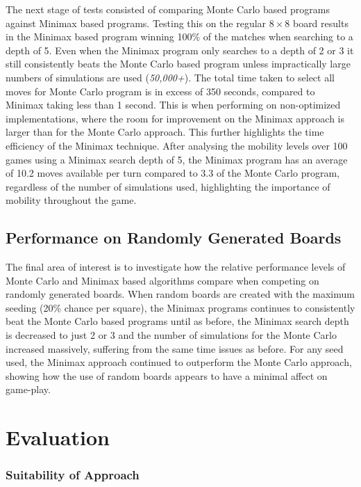 \documentclass[12pt,a4paper]{article}
\begin{document}
The next stage of tests consisted of comparing Monte Carlo based programs against Minimax based programs. Testing this on the regular $8\times8$ board results in the Minimax based program winning 100\% of the matches when searching to a depth of 5. Even when the Minimax program only searches to a depth of 2 or 3 it still consistently beats the Monte Carlo based program unless impractically large numbers of simulations are used (\textit{50,000+}). The total time taken to select all moves for Monte Carlo program is in excess of 350 seconds, compared to Minimax taking less than 1 second. This is when performing on non-optimized implementations, where the room for improvement on the Minimax approach is larger than for the Monte Carlo approach. This further highlights the time efficiency of the Minimax technique. After analysing the mobility levels over 100 games using a Minimax search depth of 5, the Minimax program has an average of 10.2 moves available per turn compared to 3.3 of the Monte Carlo program, regardless of the number of simulations used, highlighting the importance of mobility throughout the game. 

\subsection{Performance on Randomly Generated Boards}

The final area of interest is to investigate how the relative performance levels of Monte Carlo and Minimax based algorithms compare when competing on randomly generated boards. When random boards are created with the maximum seeding (20\% chance per square), the Minimax programs continues to consistently beat the Monte Carlo based programs until as before, the Minimax search depth is decreased to just 2 or 3 and the number of simulations for the Monte Carlo increased massively, suffering from the same time issues as before. For any seed used, the Minimax approach continued to outperform the Monte Carlo approach, showing how the use of random boards appears to have a minimal affect on game-play.

\section{Evaluation}

\subsubsection*{Suitability of Approach}
\end{document}
